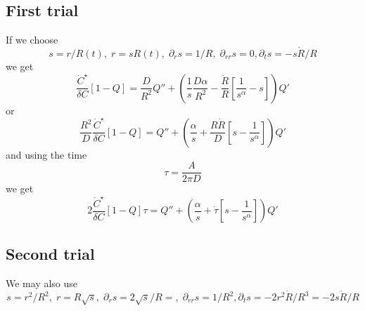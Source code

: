 \documentclass[11pt]{revtex4}
\begin{document}
\subsection{First trial}
If we choose
\begin{equation}
	s = r/R(t),\; r = s R(t),\; \partial_r s = 1/R,\;\partial_{rr} s = 0, \partial_t s = - s \dot{R}/R
\end{equation}
we get
\begin{equation}
\dfrac{\dot{C}^\star}{\delta C} \left[1-Q\right] = \dfrac{D}{R^2} Q'' + 
\left( \dfrac{1}{s} \dfrac{D \alpha}{R^2} - \dfrac{\dot{R}}{R}\left[ \dfrac{1}{s^\alpha} - s \right]\right) Q'
\end{equation}
or
\begin{equation} 
\dfrac{R^2}{D}\dfrac{\dot{C}^\star}{\delta C} \left[1-Q\right] = Q'' + \left( \dfrac{\alpha}{s} + \dfrac{R\dot{R}}{D} \left[s-\dfrac{1}{s^\alpha}\right]\right) Q'
\end{equation}
and using the time
\begin{equation}
	\tau = \dfrac{A}{2\pi D}
\end{equation}
we get
\begin{equation}
	2\dfrac{\dot{C}^\star}{\delta C} \left[1-Q\right] \tau = Q'' + \left( \dfrac{\alpha}{s} + \dot{\tau} \left[s-\dfrac{1}{s^\alpha}\right]\right) Q'
\end{equation}

\subsection{Second trial}
We may also use
\begin{equation}
	s = r^2/R^2,\; r = R\sqrt{s},\; \partial_r s = 2 \sqrt{s}/R = ,\;\partial_{rr} s = 1/R^2, \partial_t s = -2 r^2 \dot{R}/R^3 = -2 s \dot{R}/R
\end{equation}
\end{document}
